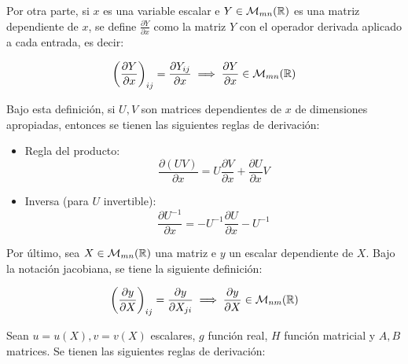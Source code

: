 Por otra parte, si $x$ es una variable escalar e $Y\in\mathcal{M}_{mn}(\mathbb{R})$ es una matriz dependiente de $x$, se define $\frac{\partial Y}{\partial x}$ como la matriz $Y$ con el operador derivada aplicado a cada entrada, es decir:

	\begin{equation*}
		\left(\frac{\partial Y}{\partial x}\right)_{ij} = \frac{\partial Y_{ij}}{\partial x} \implies \frac{\partial Y}{\partial x}\in \mathcal{M}_{mn}(\mathbb{R})
	\end{equation*}

Bajo esta definición, si $U,V$ son matrices dependientes de $x$ de dimensiones apropiadas, entonces se tienen las siguientes reglas de derivación:

\begin{itemize}
	\item Regla del producto:
	\begin{equation}
		\frac{\partial (UV)}{\partial x} = U \frac{\partial V}{\partial x} + \frac{\partial U}{\partial x}V
	\end{equation}
	
	\item Inversa (para $U$ invertible):
	\begin{equation}
		\frac{\partial U^{-1}}{\partial x} = -U^{-1} \frac{\partial U}{\partial x}-U^{-1}
	\end{equation}
\end{itemize}

Por último, sea $X\in\mathcal{M}_{mn}(\mathbb{R})$ una matriz e $y$ un escalar dependiente de $X$. Bajo la notación jacobiana, se tiene la siguiente definición:

\begin{equation*}
		\left(\frac{\partial y}{\partial X}\right)_{ij} = \frac{\partial y}{\partial X_{ji}} \implies \frac{\partial y}{\partial X}\in \mathcal{M}_{nm}(\mathbb{R})
	\end{equation*}
	
Sean $u=u(X),v=v(X)$ escalares, $g$ función real, $H$ función matricial y $A,B$ matrices. Se tienen las siguientes reglas de derivación:

